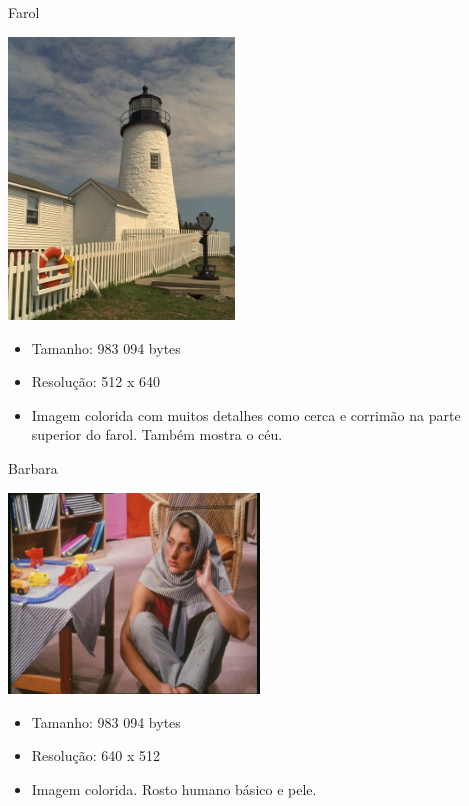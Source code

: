\documentclass{beamer}
\begin{document}
  \begin{frame}{Farol}
    \begin{multicols}{2}
      \includegraphics[width=0.45\textwidth]{figure/lighthouse100.jpg}
      \begin{itemize}
        \item Tamanho: 983 094 bytes
        \item Resolução: 512 x 640
        \item Imagem colorida com muitos detalhes como cerca e corrimão na parte superior do farol. Também mostra o céu.
      \end{itemize}
    \end{multicols}
  \end{frame}

  \begin{frame}{Barbara}
    \begin{multicols}{2}
      \includegraphics[width=0.5\textwidth]{figure/barbara100.jpg}
      \begin{itemize}
        \item Tamanho: 983 094 bytes
        \item Resolução: 640 x 512
        \item Imagem colorida. Rosto humano básico e pele.
      \end{itemize}
    \end{multicols}
  \end{frame}
\end{document}

